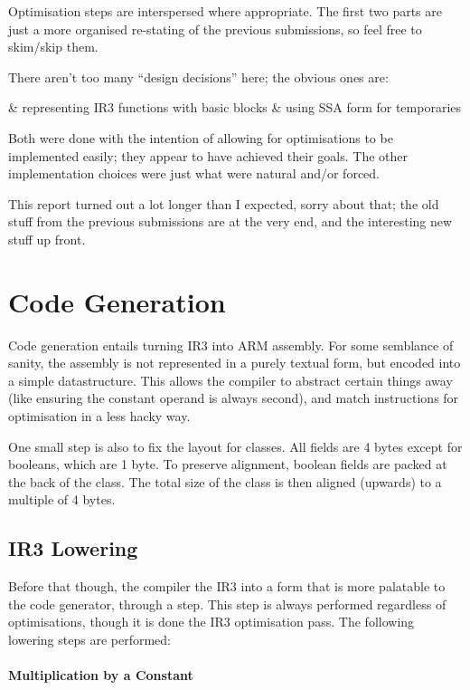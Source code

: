 \documentclass[12pt]{article}
\begin{document}
Optimisation steps are interspersed where appropriate. The first two parts are just a more organised re-stating of
the previous submissions, so feel free to skim/skip them.

There aren't too many \enquote{design decisions} here; the obvious ones are:

\begin{romanlist2}
& representing IR3 functions with basic blocks
& using SSA form for temporaries
\end{romanlist2}

Both were done with the intention of allowing for optimisations to be implemented easily; they appear to have
achieved their goals. The other implementation choices were just what were natural and/or forced.

This report turned out a lot longer than I expected, sorry about that; the old stuff from the previous submissions
are at the very end, and the interesting new stuff up front.


\section{Code Generation}

Code generation entails turning IR3 into ARM assembly. For some semblance of sanity, the assembly is not represented
in a purely textual form, but encoded into a simple datastructure. This allows the compiler to abstract certain
things away (like ensuring the constant operand is always second), and match instructions for optimisation in a less
hacky way.

One small step is also to fix the layout for classes. All fields are 4 bytes except for booleans, which are 1 byte.
To preserve alignment, boolean fields are packed at the back of the class. The total size of the class is then
aligned (upwards) to a multiple of 4 bytes.

\subsection{IR3 Lowering}

Before that though, the compiler  the IR3 into a form that is more palatable to the code generator,
through a  step. This step is always performed regardless of optimisations, though it is done 
the IR3 optimisation pass. The following lowering steps are performed:


\paragraph{Multiplication by a Constant}
\end{document}
